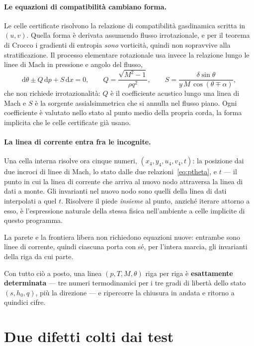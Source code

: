 \paragraph{Le equazioni di compatibilità cambiano forma.} Le celle
certificate risolvono la relazione di compatibilità gasdinamica
scritta in $(u, v)$. Quella forma è derivata assumendo flusso
irrotazionale, e per il teorema di Crocco i gradienti di entropia
\emph{sono} vorticità, quindi non sopravvive alla stratificazione. Il
processo elementare rotazionale usa invece la relazione lungo le
linee di Mach in pressione e angolo del flusso,
\begin{equation}
  \mathrm{d}\theta \pm Q\,\mathrm{d}p + S\,\mathrm{d}x = 0,
  \qquad
  Q = \frac{\sqrt{M^2-1}}{\rho q^2},
  \qquad
  S = \frac{\delta \sin\theta}{y\,M\,\cos(\theta \mp \alpha)},
  \label{eq:ptheta}
\end{equation}
che non richiede irrotazionalità: $Q$ è il coefficiente acustico
lungo una linea di Mach e $S$ è la sorgente assialsimmetrica che si
annulla nel flusso piano. Ogni coefficiente è valutato nello stato al
punto medio della propria corda, la forma implicita che le celle
certificate già usano.

\paragraph{La linea di corrente entra fra le incognite.} Una cella
interna risolve ora cinque numeri, $(x_4, y_4, u_4, v_4, t)$: la
posizione dai due incroci di linee di Mach, lo stato dalle due
relazioni~\eqref{eq:ptheta}, e $t$ --- il punto in cui la linea di
corrente che arriva al nuovo nodo attraversa la linea di dati a
monte. Gli invarianti nel nuovo nodo sono quelli della linea di dati
interpolati a quel $t$. Risolvere il piede \emph{insieme} al punto,
anziché iterare attorno a esso, è l'espressione naturale della stessa
fisica nell'ambiente a celle implicite di questo programma.

La parete e la frontiera libera non richiedono equazioni nuove:
entrambe sono linee di corrente, quindi ciascuna porta con sé, per
l'intera marcia, gli invarianti della riga da cui parte.

Con tutto ciò a posto, una linea $(p, T, M, \theta)$ riga per riga è
\textbf{esattamente determinata} --- tre numeri termodinamici per i
tre gradi di libertà dello stato $(s, h_0, q)$, più la direzione ---
e ripercorre la chiusura in andata e ritorno a quindici cifre.

\section{Due difetti colti dai test}

